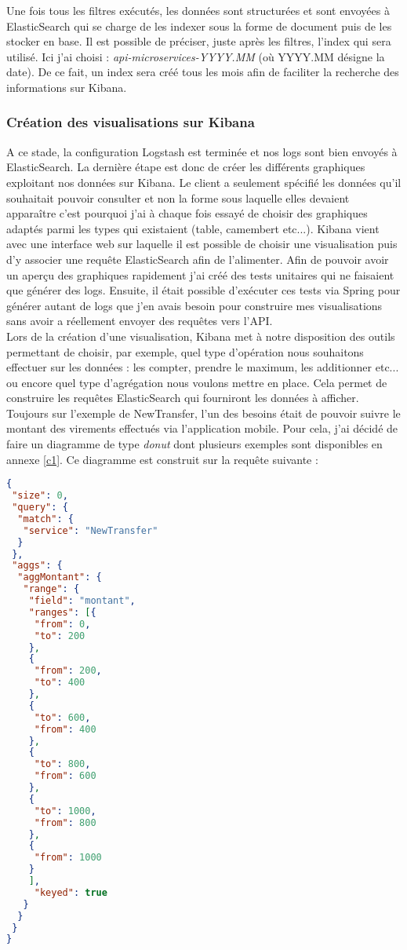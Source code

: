 	Une fois tous les filtres exécutés, les données sont structurées et sont envoyées à ElasticSearch qui se charge de les indexer sous la forme de document puis de les stocker en base. Il est possible de préciser, juste après les filtres, l'index qui sera utilisé. Ici j'ai choisi : \textit{api-microservices-YYYY.MM} (où YYYY.MM désigne la date). De ce fait, un index sera créé tous les mois afin de faciliter la recherche des informations sur Kibana. 
	
	\subsubsection{Création des visualisations sur Kibana}
	
	A ce stade, la configuration Logstash est terminée et nos logs sont bien envoyés à ElasticSearch. La dernière étape est donc de créer les différents graphiques exploitant nos données sur Kibana. Le client a seulement spécifié les données qu'il souhaitait pouvoir consulter et non la forme sous laquelle elles devaient apparaître c'est pourquoi j'ai à chaque fois essayé de choisir des graphiques adaptés parmi les types qui existaient (table, camembert etc...). Kibana vient avec une interface web sur laquelle il est possible de choisir une visualisation puis d'y associer une requête ElasticSearch afin de l'alimenter. Afin de pouvoir avoir un aperçu des graphiques rapidement j'ai créé des tests unitaires qui ne faisaient que générer des logs. Ensuite, il était possible d'exécuter ces tests via Spring pour générer autant de logs que j'en avais besoin pour construire mes visualisations sans avoir a réellement envoyer des requêtes vers l'API. \\
	
	Lors de la création d'une visualisation, Kibana met à notre disposition des outils permettant de choisir, par exemple, quel type d'opération nous souhaitons effectuer sur les données : les compter, prendre le maximum, les additionner etc... ou encore quel type d'agrégation nous voulons mettre en place. Cela permet de construire les requêtes ElasticSearch qui fourniront les données à afficher. Toujours sur l'exemple de NewTransfer, l'un des besoins était de pouvoir suivre le montant des virements effectués via l'application mobile. Pour cela, j'ai décidé de faire un diagramme de type \textit{donut} dont plusieurs exemples sont disponibles en annexe \ref{c1}. Ce diagramme est construit sur la requête suivante :
	
\begin{lstlisting}[language=json]
{
 "size": 0,
 "query": {
  "match": {
   "service": "NewTransfer"
  }
 },
 "aggs": {
  "aggMontant": {
   "range": {
    "field": "montant",
	"ranges": [{
	 "from": 0,
	 "to": 200
	},
	{
	 "from": 200,
	 "to": 400
	},
	{
	 "to": 600,
	 "from": 400
	},
	{
	 "to": 800,
	 "from": 600
	},
	{
	 "to": 1000,
	 "from": 800
	},
	{
	 "from": 1000
	}
	],
	 "keyed": true
   }
  }
 }
}	
\end{lstlisting}

